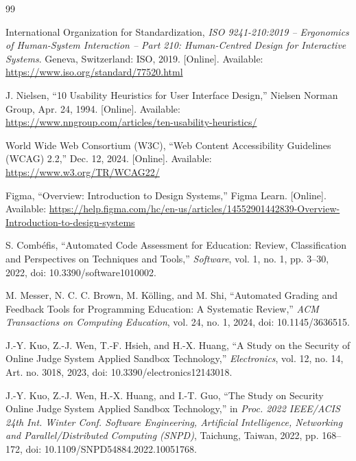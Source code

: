 \documentclass[12pt,a4paper,oneside]{report}
\begin{document}
\begin{thebibliography}{99}

International Organization for Standardization, \textit{ISO 9241-210:2019 -- Ergonomics of Human-System Interaction -- Part 210: Human-Centred Design for Interactive Systems}. Geneva, Switzerland: ISO, 2019. [Online]. Available: \url{https://www.iso.org/standard/77520.html}

J. Nielsen, ``10 Usability Heuristics for User Interface Design,'' Nielsen Norman Group, Apr. 24, 1994. [Online]. Available: \url{https://www.nngroup.com/articles/ten-usability-heuristics/}

World Wide Web Consortium (W3C), ``Web Content Accessibility Guidelines (WCAG) 2.2,'' Dec. 12, 2024. [Online]. Available: \url{https://www.w3.org/TR/WCAG22/}

Figma, ``Overview: Introduction to Design Systems,'' Figma Learn. [Online]. Available: \url{https://help.figma.com/hc/en-us/articles/14552901442839-Overview-Introduction-to-design-systems}

S. Combéfis, ``Automated Code Assessment for Education: Review, Classification and Perspectives on Techniques and Tools,'' \textit{Software}, vol. 1, no. 1, pp. 3--30, 2022, doi: 10.3390/software1010002.

M. Messer, N. C. C. Brown, M. Kölling, and M. Shi, ``Automated Grading and Feedback Tools for Programming Education: A Systematic Review,'' \textit{ACM Transactions on Computing Education}, vol. 24, no. 1, 2024, doi: 10.1145/3636515.

J.-Y. Kuo, Z.-J. Wen, T.-F. Hsieh, and H.-X. Huang, ``A Study on the Security of Online Judge System Applied Sandbox Technology,'' \textit{Electronics}, vol. 12, no. 14, Art. no. 3018, 2023, doi: 10.3390/electronics12143018.

J.-Y. Kuo, Z.-J. Wen, H.-X. Huang, and I.-T. Guo, ``The Study on Security Online Judge System Applied Sandbox Technology,'' in \textit{Proc. 2022 IEEE/ACIS 24th Int. Winter Conf. Software Engineering, Artificial Intelligence, Networking and Parallel/Distributed Computing (SNPD)}, Taichung, Taiwan, 2022, pp. 168--172, doi: 10.1109/SNPD54884.2022.10051768.

\end{thebibliography}
\end{document}
